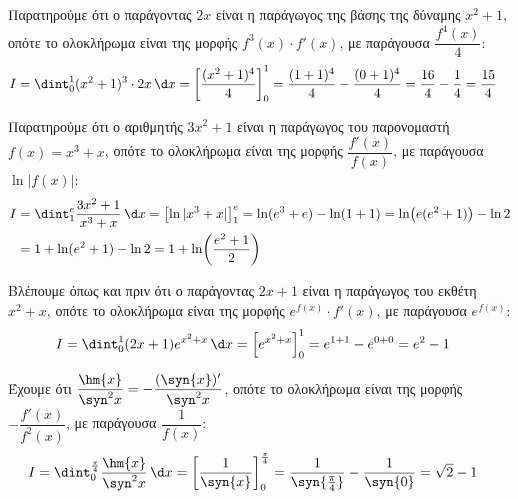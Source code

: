 \begin{alist}
\item Παρατηρούμε ότι ο παράγοντας $2x$ είναι η παράγωγος της βάσης της δύναμης $x^2+1$, οπότε το ολοκλήρωμα είναι της μορφής $f^3(x)\cdot f'(x)$, με παράγουσα $\dfrac{f^4(x)}{4}$:
\begin{align*}
I &= \dint_0^1 (x^2+1)^3 \cdot 2x \, \d x = \left[\frac{(x^2+1)^4}{4}\right]_0^1 = \frac{(1+1)^4}{4} - \frac{(0+1)^4}{4} = \frac{16}{4} - \frac{1}{4} = \frac{15}{4}
\end{align*}

\item Παρατηρούμε ότι ο αριθμητής $3x^2+1$ είναι η παράγωγος του παρονομαστή $f(x)=x^3+x$, οπότε το ολοκλήρωμα είναι της μορφής $\dfrac{f'(x)}{f(x)}$, με παράγουσα $\ln|f(x)|$:
\begin{align*}
I &= \dint_1^e \frac{3x^2+1}{x^3+x} \, \d x = \left[\ln|x^3+x|\right]_1^e = \ln(e^3+e) - \ln(1+1) = \ln\bigl(e(e^2+1)\bigr) - \ln 2 \\
&= 1 + \ln(e^2+1) - \ln 2 = 1 + \ln\!\left(\frac{e^2+1}{2}\right)
\end{align*}

\item Βλέπουμε όπως και πριν ότι ο παράγοντας $2x+1$ είναι η παράγωγος του εκθέτη $x^2+x$, οπότε το ολοκλήρωμα είναι της μορφής $e^{f(x)}\cdot f'(x)$, με παράγουσα $e^{f(x)}$:
\begin{align*}
I &= \dint_0^1 (2x+1)e^{x^2+x} \, \d x = \left[e^{x^2+x}\right]_0^1 = e^{1+1} - e^{0+0} = e^2 - 1
\end{align*}

\item Έχουμε ότι $\dfrac{\hm{x}}{\syn^2{x}}=-\dfrac{(\syn{x})'}{\syn^2{x}}$, οπότε το ολοκλήρωμα είναι της μορφής $-\dfrac{f'(x)}{f^2(x)}$, με παράγουσα $\dfrac{1}{f(x)}$:
\begin{align*}
I &= \dint_0^{\frac{\pi}{4}} \frac{\hm{x}}{\syn^2{x}} \, \d x = \left[\dfrac{1}{\syn{x}}\right]_0^{\frac{\pi}{4}} = \frac{1}{\syn{\frac{\pi}{4}}}-\frac{1}{\syn{0}}=\sqrt{2}-1
\end{align*}
\end{alist}

